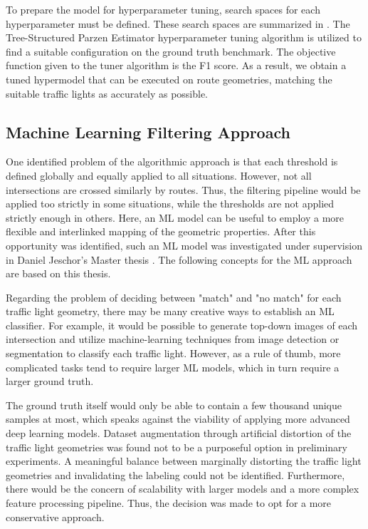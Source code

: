 To prepare the model for hyperparameter tuning, search spaces for each hyperparameter must be defined. These search spaces are summarized in . The Tree-Structured Parzen Estimator hyperparameter tuning algorithm \cite{ozaki_multiobjective_2020} is utilized to find a suitable configuration on the ground truth benchmark. The objective function given to the tuner algorithm is the F1 score. As a result, we obtain a tuned hypermodel that can be executed on route geometries, matching the suitable traffic lights as accurately as possible.

\subsection{Machine Learning Filtering Approach}\label{sec:jeschor1}

One identified problem of the algorithmic approach is that each threshold is defined globally and equally applied to all situations. However, not all intersections are crossed similarly by routes. Thus, the filtering pipeline would be applied too strictly in some situations, while the thresholds are not applied strictly enough in others. Here, an ML model can be useful to employ a more flexible and interlinked mapping of the geometric properties. After this opportunity was identified, such an ML model was investigated under supervision in Daniel Jeschor's Master thesis \cite{jeschor_2022}. The following concepts for the ML approach are based on this thesis.

Regarding the problem of deciding between "match" and "no match" for each traffic light geometry, there may be many creative ways to establish an ML classifier. For example, it would be possible to generate top-down images of each intersection and utilize machine-learning techniques from image detection or segmentation to classify each traffic light. However, as a rule of thumb, more complicated tasks tend to require larger ML models, which in turn require a larger ground truth. 

The ground truth itself would only be able to contain a few thousand unique samples at most, which speaks against the viability of applying more advanced deep learning models. Dataset augmentation through artificial distortion of the traffic light geometries was found not to be a purposeful option in preliminary experiments. A meaningful balance between marginally distorting the traffic light geometries and invalidating the labeling could not be identified. Furthermore, there would be the concern of scalability with larger models and a more complex feature processing pipeline. Thus, the decision was made to opt for a more conservative approach.

